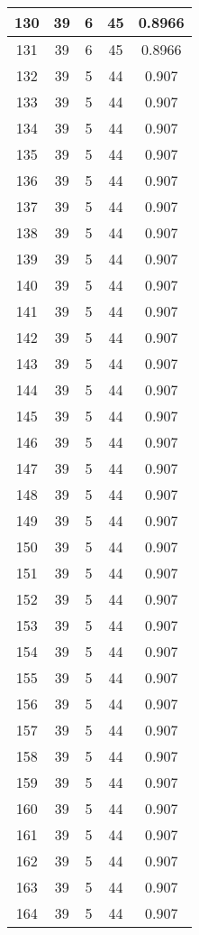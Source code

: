 \documentclass[letterpaper, 12pt]{article}
\begin{document}
\begin{longtable}{|c|c|c|c|c|}
\hline
130 & 39 & 6 & 45 & 0.8966 \\
\hline
131 & 39 & 6 & 45 & 0.8966 \\
\hline
132 & 39 & 5 & 44 & 0.907 \\
\hline
133 & 39 & 5 & 44 & 0.907 \\
\hline
134 & 39 & 5 & 44 & 0.907 \\
\hline
135 & 39 & 5 & 44 & 0.907 \\
\hline
136 & 39 & 5 & 44 & 0.907 \\
\hline
137 & 39 & 5 & 44 & 0.907 \\
\hline
138 & 39 & 5 & 44 & 0.907 \\
\hline
139 & 39 & 5 & 44 & 0.907 \\
\hline
140 & 39 & 5 & 44 & 0.907 \\
\hline
141 & 39 & 5 & 44 & 0.907 \\
\hline
142 & 39 & 5 & 44 & 0.907 \\
\hline
143 & 39 & 5 & 44 & 0.907 \\
\hline
144 & 39 & 5 & 44 & 0.907 \\
\hline
145 & 39 & 5 & 44 & 0.907 \\
\hline
146 & 39 & 5 & 44 & 0.907 \\
\hline
147 & 39 & 5 & 44 & 0.907 \\
\hline
148 & 39 & 5 & 44 & 0.907 \\
\hline
149 & 39 & 5 & 44 & 0.907 \\
\hline
150 & 39 & 5 & 44 & 0.907 \\
\hline
151 & 39 & 5 & 44 & 0.907 \\
\hline
152 & 39 & 5 & 44 & 0.907 \\
\hline
153 & 39 & 5 & 44 & 0.907 \\
\hline
154 & 39 & 5 & 44 & 0.907 \\
\hline
155 & 39 & 5 & 44 & 0.907 \\
\hline
156 & 39 & 5 & 44 & 0.907 \\
\hline
157 & 39 & 5 & 44 & 0.907 \\
\hline
158 & 39 & 5 & 44 & 0.907 \\
\hline
159 & 39 & 5 & 44 & 0.907 \\
\hline
160 & 39 & 5 & 44 & 0.907 \\
\hline
161 & 39 & 5 & 44 & 0.907 \\
\hline
162 & 39 & 5 & 44 & 0.907 \\
\hline
163 & 39 & 5 & 44 & 0.907 \\
\hline
164 & 39 & 5 & 44 & 0.907 \\

\end{longtable}
\end{document}
